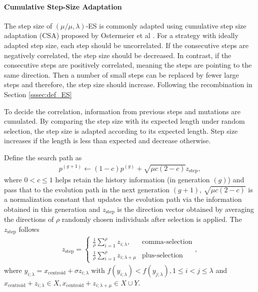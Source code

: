 \paragraph{Cumulative Step-Size Adaptation} 
The step size of $(\mu/\mu,\lambda)$-ES is commonly adapted using cumulative step size adaptation (CSA) proposed by Ostermeier et al \cite{Ostermeier:1994:DAS:1326675.1326679}. For a strategy with ideally adapted step size, each step should be uncorrelated. If the consecutive steps are negatively correlated, the step size should be decreased. In contrast, if the consecutive steps are positively correlated, meaning the steps are pointing to the same direction. Then a number of small steps can be replaced by fewer large steps and therefore, the step size should increase. 
Following the recombination in Section \ref{sssec:def_ES}


To decide the correlation, information from previous steps and mutations are cumulated. By comparing the step size with its expected length under random selection, the step size is adapted according to its expected length. Step size increases if the length is less than expected and decrease otherwise. 

Define the search path as 
\begin{align}
p^{(g+1)} \leftarrow (1-c)p^{(g)} + \sqrt{\mu c (2-c)} z_{\text{step}},
\end{align}
where $0<c \leq 1$ helps retain the history information (in generation $(g)$) and pass that to the evolution path in the next generation $(g+1)$, $ \sqrt{\mu c (2-c)}$ is a normalization constant that updates the evolution path via the information obtained in this generation and $z_{\text{step}}$ is the direction vector obtained by averaging the directions of $\rho$ randomly chosen individuals after selection is applied. The $z_{\text{step}}$ follows
\begin{align}
z_{\text{step}} = 
\begin{cases}
 \frac{1}{\rho} \sum_{i=1}^\rho z_{i;\lambda},& \text{comma-selection}\\
\frac{1}{\rho} \sum_{i=1}^\rho z_{i;\lambda+\mu} & \text{plus-selection}
\end{cases},
\end{align}
where $y_{i;\lambda} = x_{\text{centroid}} +\sigma z_{i;\lambda}$ with $f(y_{i;\lambda})< f(y_{j;\lambda}), 1 \leq i < j \leq \lambda$ and $x_{\text{centroid}} + z_{i;\lambda} \in X,x_{\text{centroid}} + z_{i;\lambda+\mu} \in X \cup Y $. 

